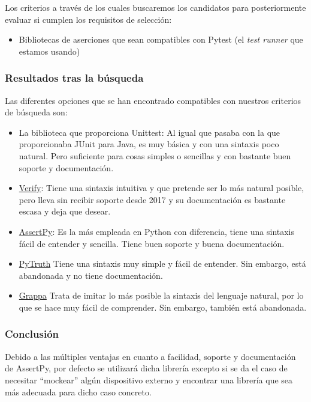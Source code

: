 Los criterios a través de los cuales buscaremos los candidatos para
posteriormente evaluar si cumplen los requisitos de selección:
\begin{itemize}
    \item Bibliotecas de aserciones que sean compatibles con Pytest (el
    \emph{test runner} que estamos usando)
\end{itemize}

\subsubsection{Resultados tras la búsqueda}

Las diferentes opciones que se han encontrado compatibles con nuestros criterios
de búsqueda son:

\begin{itemize}
    \item La biblioteca que proporciona Unittest: Al igual que pasaba con la que
    proporcionaba JUnit para Java, es muy básica y con una sintaxis poco
    natural. Pero suficiente para cosas simples o sencillas y con bastante buen
    soporte y documentación.
    \item \href{https://github.com/dgilland/verify}{Verify}: Tiene una sintaxis
    intuitiva y que pretende ser lo más natural posible, pero lleva sin recibir
    soporte desde 2017 y su documentación es bastante escasa y deja que desear.
    \item \href{https://github.com/assertpy/assertpy}{AssertPy}: Es la más empleada
    en Python con diferencia, tiene una sintaxis fácil de entender y sencilla.
    Tiene buen soporte y buena documentación.
    \item \href{https://github.com/google/pytruth}{PyTruth} Tiene una sintaxis
    muy simple y fácil de entender. Sin embargo, está abandonada y no tiene
    documentación.
    \item \href{https://github.com/grappa-py/grappa}{Grappa} Trata de imitar lo
    más posible la sintaxis del lenguaje natural, por lo que se hace muy fácil
    de comprender. Sin embargo, también está abandonada.
\end{itemize}

\subsubsection{Conclusión}

Debido a las múltiples ventajas en cuanto a facilidad, soporte y documentación
de AssertPy, por defecto se utilizará dicha librería excepto si se da el caso de
necesitar ``mockear'' algún dispositivo externo y encontrar una librería que sea
más adecuada para dicho caso concreto.

